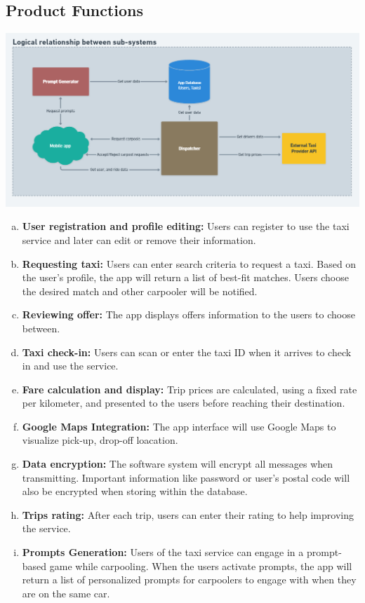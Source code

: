 \documentclass[]{article}
\begin{document}
\subsection{Product Functions}
\label{sub:product_functions}
	\begin{center}
		\includegraphics[scale=0.7]{subsys-relationship.png}
	\end{center}

\begin{enumerate}[a)]
	\item \textbf{User registration and profile editing: }Users can register to use the taxi service and later can edit or remove their information.
	\item \textbf{Requesting taxi: }Users can enter search criteria to request a taxi. Based on the user’s profile, the app will return a list of best-fit matches. Users choose the desired match and other carpooler will be notified. 
	\item \textbf{Reviewing offer: }The app displays offers information to the users to choose between.
	\item \textbf{Taxi check-in: }Users can scan or enter the taxi ID when it arrives to check in and use the service.
	\item \textbf{Fare calculation and display:  }Trip prices are calculated, using a fixed rate per kilometer, and presented to the users before reaching their destination. 
	\item \textbf{Google Maps Integration:  }The app interface will use Google Maps to visualize pick-up, drop-off loacation. 
	\item \textbf{Data encryption:  }The software system will encrypt all messages when transmitting. Important information like password or user’s postal code will also be encrypted when storing within the database.
	\item \textbf{Trips rating:  }After each trip, users can enter their rating to help improving the service.
	\item \textbf{Prompts Generation:  }Users of the taxi service can engage in a prompt-based game while carpooling. When the users activate prompts, the app will return a list of personalized prompts for carpoolers to engage with when they are on the same car.


\end{enumerate}
\end{document}
